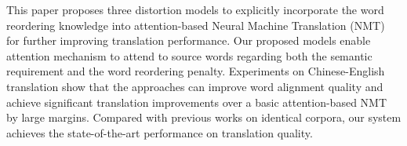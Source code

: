 This paper proposes three distortion models to explicitly incorporate the word reordering knowledge into attention-based Neural Machine Translation (NMT) for further improving translation performance. Our proposed models enable attention mechanism to attend to source words regarding both the semantic requirement and the word reordering penalty. Experiments on Chinese-English translation show that the approaches can improve word alignment quality and achieve significant translation improvements over a basic attention-based NMT by large margins. Compared with previous works on identical corpora, our system achieves the state-of-the-art performance on translation quality.
